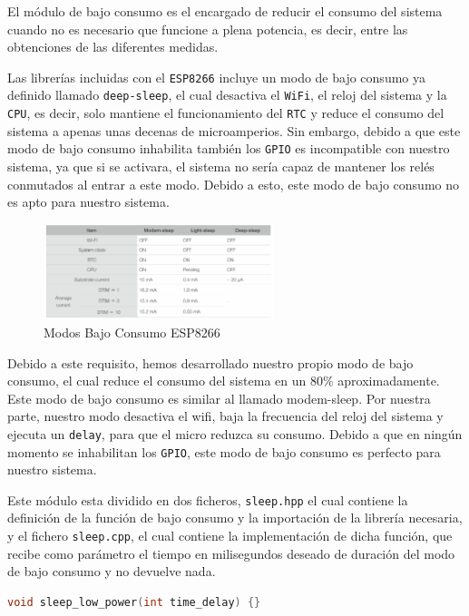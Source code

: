 El módulo de bajo consumo es el encargado de reducir el consumo del sistema cuando no es necesario que funcione a plena potencia, es decir, entre las obtenciones de las diferentes medidas.

Las librerías incluidas con el \texttt{ESP8266} incluye un modo de bajo consumo ya definido llamado \texttt{deep-sleep}, el cual desactiva el \texttt{WiFi}, el reloj del sistema y la \texttt{CPU}, es decir, solo mantiene el funcionamiento del \texttt{RTC} y reduce el consumo del sistema a apenas unas decenas de microamperios. Sin embargo, debido a que este modo de bajo consumo inhabilita también los \texttt{GPIO} es incompatible con nuestro sistema, ya que si se activara, el sistema no sería capaz de mantener los relés conmutados al entrar a este modo. Debido a esto, este modo de bajo consumo no es apto para nuestro sistema. \cite{esp8266ESP8266LowPower}

\begin{figure}[H]
    \centering
    \includegraphics[width=0.6\textwidth]{images/3-software/3-2-5-lowpower/Modos Bajo Consumo.png}
    \caption{Modos Bajo Consumo ESP8266}
    \label{fig:3-2-5-1-ModosBajoConsumo}
\end{figure}

Debido a este requisito, hemos desarrollado nuestro propio modo de bajo consumo, el cual reduce el consumo del sistema en un $80\%$ aproximadamente. Este modo de bajo consumo es similar al llamado modem-sleep. Por nuestra parte, nuestro modo desactiva el wifi, baja la frecuencia del reloj del sistema y ejecuta un \texttt{delay}, para que el micro reduzca su consumo. Debido a que en ningún momento se inhabilitan los \texttt{GPIO}, este modo de bajo consumo es perfecto para nuestro sistema.

Este módulo esta dividido en dos ficheros, \texttt{sleep.hpp} el cual contiene la definición de la función de bajo consumo y la importación de la librería necesaria, y el fichero \texttt{sleep.cpp}, el cual contiene la implementación de dicha función, que recibe como parámetro el tiempo en milisegundos deseado de duración del modo de bajo consumo y no devuelve nada.

\begin{lstlisting}[captionpos=b, caption={Función bajo consumo}, language=c++]
    void sleep_low_power(int time_delay) {}
\end{lstlisting}

